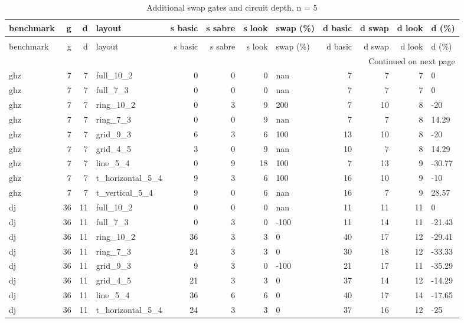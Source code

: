 \begin{longtable}{lrrlrrrlrrrl}
\caption{Additional swap gates and circuit depth, n = 5} \label{benchmark-table-5} \\
\toprule
benchmark & g & d & layout & s basic & s sabre & s look & swap (\%) & d basic & d swap & d look & d (\%) \\
\midrule
\endfirsthead
\caption[]{Additional swap gates and circuit depth, n = 5} \\
\toprule
benchmark & g & d & layout & s basic & s sabre & s look & swap (\%) & d basic & d swap & d look & d (\%) \\
\midrule
\endhead
\midrule
\multicolumn{12}{r}{Continued on next page} \\
\midrule
\endfoot
\bottomrule
\endlastfoot
ghz & 7 & 7 & full\_10\_2 & 0 & 0 & 0 & nan & 7 & 7 & 7 & 0 \\
ghz & 7 & 7 & full\_7\_3 & 0 & 0 & 0 & nan & 7 & 7 & 7 & 0 \\
ghz & 7 & 7 & ring\_10\_2 & 0 & 3 & 9 & 200 & 7 & 10 & 8 & -20 \\
ghz & 7 & 7 & ring\_7\_3 & 0 & 0 & 9 & nan & 7 & 7 & 8 & 14.29 \\
ghz & 7 & 7 & grid\_9\_3 & 6 & 3 & 6 & 100 & 13 & 10 & 8 & -20 \\
ghz & 7 & 7 & grid\_4\_5 & 3 & 0 & 9 & nan & 10 & 7 & 8 & 14.29 \\
ghz & 7 & 7 & line\_5\_4 & 0 & 9 & 18 & 100 & 7 & 13 & 9 & -30.77 \\
ghz & 7 & 7 & t\_horizontal\_5\_4 & 9 & 3 & 6 & 100 & 16 & 10 & 9 & -10 \\
ghz & 7 & 7 & t\_vertical\_5\_4 & 9 & 0 & 6 & nan & 16 & 7 & 9 & 28.57 \\
dj & 36 & 11 & full\_10\_2 & 0 & 0 & 0 & nan & 11 & 11 & 11 & 0 \\
dj & 36 & 11 & full\_7\_3 & 0 & 3 & 0 & -100 & 11 & 14 & 11 & -21.43 \\
dj & 36 & 11 & ring\_10\_2 & 36 & 3 & 3 & 0 & 40 & 17 & 12 & -29.41 \\
dj & 36 & 11 & ring\_7\_3 & 24 & 3 & 3 & 0 & 30 & 18 & 12 & -33.33 \\
dj & 36 & 11 & grid\_9\_3 & 9 & 3 & 0 & -100 & 21 & 17 & 11 & -35.29 \\
dj & 36 & 11 & grid\_4\_5 & 21 & 3 & 3 & 0 & 37 & 14 & 12 & -14.29 \\
dj & 36 & 11 & line\_5\_4 & 36 & 6 & 6 & 0 & 40 & 17 & 14 & -17.65 \\
dj & 36 & 11 & t\_horizontal\_5\_4 & 24 & 3 & 3 & 0 & 37 & 16 & 12 & -25 \\

\end{longtable}
